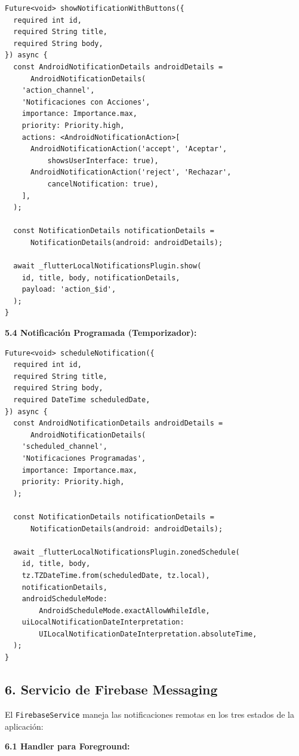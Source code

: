 \documentclass[12pt,a4paper]{article}
\begin{document}
\begin{verbatim}
Future<void> showNotificationWithButtons({
  required int id,
  required String title,
  required String body,
}) async {
  const AndroidNotificationDetails androidDetails =
      AndroidNotificationDetails(
    'action_channel',
    'Notificaciones con Acciones',
    importance: Importance.max,
    priority: Priority.high,
    actions: <AndroidNotificationAction>[
      AndroidNotificationAction('accept', 'Aceptar',
          showsUserInterface: true),
      AndroidNotificationAction('reject', 'Rechazar',
          cancelNotification: true),
    ],
  );

  const NotificationDetails notificationDetails =
      NotificationDetails(android: androidDetails);

  await _flutterLocalNotificationsPlugin.show(
    id, title, body, notificationDetails,
    payload: 'action_$id',
  );
}
\end{verbatim}

\textbf{5.4 Notificación Programada (Temporizador):}

\begin{verbatim}
Future<void> scheduleNotification({
  required int id,
  required String title,
  required String body,
  required DateTime scheduledDate,
}) async {
  const AndroidNotificationDetails androidDetails =
      AndroidNotificationDetails(
    'scheduled_channel',
    'Notificaciones Programadas',
    importance: Importance.max,
    priority: Priority.high,
  );

  const NotificationDetails notificationDetails =
      NotificationDetails(android: androidDetails);

  await _flutterLocalNotificationsPlugin.zonedSchedule(
    id, title, body,
    tz.TZDateTime.from(scheduledDate, tz.local),
    notificationDetails,
    androidScheduleMode: 
        AndroidScheduleMode.exactAllowWhileIdle,
    uiLocalNotificationDateInterpretation:
        UILocalNotificationDateInterpretation.absoluteTime,
  );
}
\end{verbatim}

\newpage

\subsection*{6. Servicio de Firebase Messaging}

El \texttt{FirebaseService} maneja las notificaciones remotas en los tres estados de la aplicación:

\textbf{6.1 Handler para Foreground:}
\end{document}
